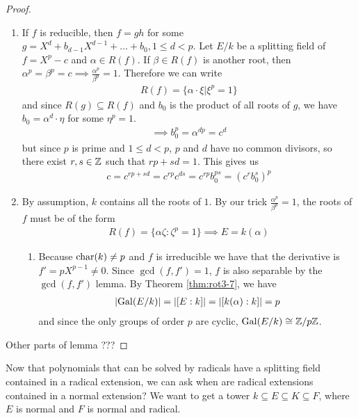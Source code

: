\begin{proof}
\begin{enumerate}
  \item If $f$ is reducible, then $f = gh$ for some $g = X^{d} + b_{d-1}X^{d-1} + \ldots + b_0, 1 \leq d < p$.
    Let $E/k$ be a splitting field of $f = X^{p} - c$ and $\alpha \in R(f)$.
    If $\beta \in R(f)$ is another root, then $\alpha^{p} = \beta^{p}=c \implies \tfrac{\alpha^{p}}{\beta^{p}} = 1$.
    Therefore we can write
    \begin{align*}
      R(f) = \{\alpha \cdot \xi \big\vert \xi^{p} = 1\}
    \end{align*}
    and since $R(g) \subseteq R(f)$ and $b_0$ is the product of all roots of $g$, we have $b_0 = \alpha^{d} \cdot \eta$ for some $\eta^{p} = 1$.
  \begin{align*}
  \implies b_0^{p}= \alpha^{dp} = c^{d}
  \end{align*}
  but since $p$ is prime and $1 \leq d < p$, $p$ and $d$ have no common divisors, so there exist $r,s \in \mathbb{Z}$ such that $rp + sd = 1$.
  This gives us
  \begin{align*}
    c = c^{rp + sd} = c^{rp}c^{ds} = c^{rp}b_0^{ps} = \left(
      c^{r}b_0^{s}
    \right)^{p}
  \end{align*}
\item By assumption, $k$ contains all the roots of $1$. By our trick $\tfrac{\alpha^{p}}{\beta^{p}} = 1$, the roots of $f$ must be of the form  
  \begin{align*}
    R(f) = \{\alpha \zeta: \zeta^{p} = 1\} \implies E = k(\alpha) 
  \end{align*}
  \begin{enumerate}
    \item Because $\operatorname{char}(k) \neq p$ and $f$ is irreducible we have that the derivative is $f' = pX^{p-1} \neq 0$.
      Since $\gcd(f,f') = 1$, $f$ is also separable by the $\gcd(f,f')$ lemma.
      By Theorem \ref{thm:rot3-7}, we have
      \begin{align*}
        \abs{\Gal(E/k)} = \abs{[E:k]} = \abs{[k(\alpha):k]} = p
      \end{align*}
      and since the only groups of order $p$ are cyclic, $\operatorname{Gal}(E/k) \cong \mathbb{Z}/p\mathbb{Z}$.
  \end{enumerate}
\end{enumerate}
Other parts of lemma ???
\end{proof}

Now that polynomials that can be solved by radicals have a splitting field contained in a radical extension, we can ask
when are radical extensions contained in a normal extension?
We want to get a tower $k \subseteq E \subseteq K \subseteq F$, where $E$ is normal and $F$ is normal and radical.

